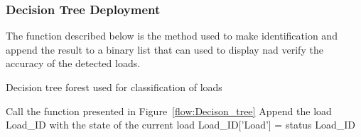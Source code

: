 \subsubsection{Decision Tree Deployment}
\label{sec:deply_DT}

The function described below is the method used to make identification and append the result to a binary list that can used to display nad verify the accuracy of the detected loads.
\begin{algorithm}[H]
\caption{Decision tree forest used for classification of loads}
\label{alg:deply_DT}
\begin{algorithmic}
\State Call the function presented in Figure~\ref{flow:Decison_tree}
\State Append the load Load\_ID with the state of the current load
\State Load\_ID['Load'] = status
\EndFor
\State \Return Load\_ID
\EndFunction
\end{algorithmic}
\end{algorithm}


